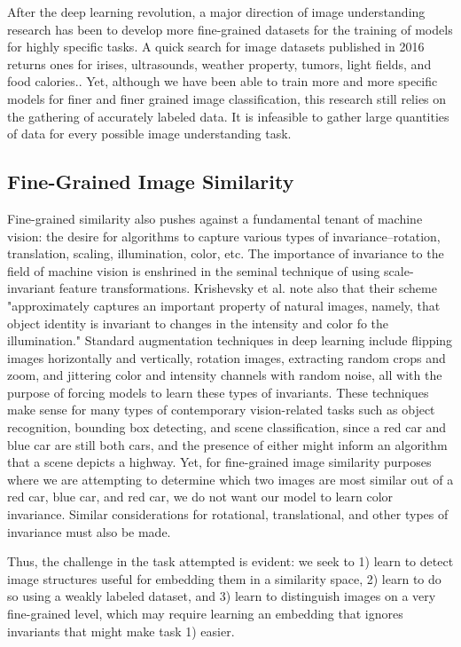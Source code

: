 After the deep learning revolution, a major direction of image understanding research has been to develop more fine-grained datasets for the training of models for highly specific tasks. A quick search for image datasets published in 2016 returns ones for irises, ultrasounds, weather property, tumors, light fields, and food calories.\cite{bowyer2016nd}\cite{cortes2016ultrasound}\cite{chu2016image2weather}\cite{shi2016stacked}\cite{paudyal2016smart}\cite{pouladzadeh2015foodd}. Yet, although we have been able to train more and more specific models for finer and finer grained image classification, this research still relies on the gathering of accurately labeled data. It is infeasible to gather large quantities of data for every possible image understanding task.

\subsection{Fine-Grained Image Similarity}

Fine-grained similarity also pushes against a fundamental tenant of machine vision: the desire for algorithms to capture various types of invariance--rotation, translation, scaling, illumination, color, etc. The importance of invariance to the field of machine vision is enshrined in the seminal technique of using scale-invariant feature transformations. Krishevsky et al. note also that their scheme "approximately captures an important property of natural images, namely, that object identity is invariant to changes in the intensity and color fo the illumination."\cite{krizhevsky2012imagenet} Standard augmentation techniques in deep learning include flipping images horizontally and vertically, rotation images, extracting random crops and zoom, and jittering color and intensity channels with random noise, all with the purpose of forcing models to learn these types of invariants. These techniques make sense for many types of contemporary vision-related tasks such as object recognition, bounding box detecting, and scene classification, since a red car and blue car are still both cars, and the presence of either might inform an algorithm that a scene depicts a highway. Yet, for fine-grained image similarity purposes where we are attempting to determine which two images are most similar out of a red car, blue car, and red car, we do not want our model to learn color invariance. Similar considerations for rotational, translational, and other types of invariance must also be made.

Thus, the challenge in the task attempted is evident: we seek to 1) learn to detect image structures useful for embedding them in a similarity space, 2) learn to do so using a weakly labeled dataset, and 3) learn to distinguish images on a very fine-grained level, which may require learning an embedding that ignores invariants that might make task 1) easier.

